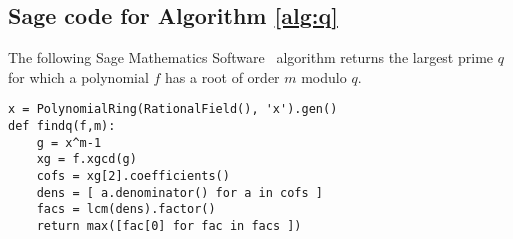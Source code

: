 \documentclass{llncs}
\newcommand{\<}{\langle}
\renewcommand{\>}{\rangle}
\begin{document}
\subsection{Sage code for Algorithm \ref{alg:q}} \label{A2}

The following Sage Mathematics Software~\cite{S} algorithm returns the largest prime $q$ for which a polynomial $f$ has a root of order $m$ modulo $q$.

\scriptsize
\begin{verbatim}
x = PolynomialRing(RationalField(), 'x').gen()
def findq(f,m):
    g = x^m-1
    xg = f.xgcd(g)
    cofs = xg[2].coefficients()
    dens = [ a.denominator() for a in cofs ]
    facs = lcm(dens).factor()
    return max([fac[0] for fac in facs ])
\end{verbatim}
\normalsize
\end{document}
